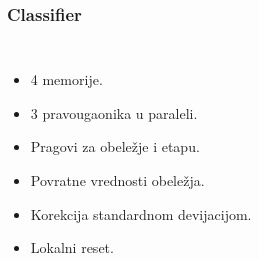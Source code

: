 \documentclass{beamer}
\begin{document}
\begin{frame}
  \frametitle<1-1>{Classifier}

  \begin{columns}[onlytextwidth,T]
    \column{\dimexpr\linewidth-76mm-1mm}
    \begin{itemize}
    \item<1-> 4 memorije.
    \item<1-> 3 pravougaonika u paraleli.
    \item<1-> Pragovi za obeležje i etapu.
    \item<1-> Povratne vrednosti obeležja.
    \item<1-> Korekcija standardnom devijacijom.
    \item<1-> Lokalni reset.
    \end{itemize}


    \column{80mm}
      \begin{figure}[H]
        \resizebox{0.92\textwidth}{!}{%
          
          }
        \end{figure}

  \end{columns}


\end{frame}
\end{document}
